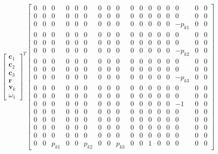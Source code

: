 \documentclass{article}
\begin{document}
\begin{align}
    \begin{bmatrix}
        \mathbf{c}_1 \\
        \mathbf{c}_2 \\
        \mathbf{c}_3 \\
        \mathbf{r} \\
        \mathbf{v}_k \\
        \omega_1
    \end{bmatrix}^T 
    \begin{bmatrix}
        0 & 0 & 0 & 0 & 0 & 0 & 0 & 0 & 0 & 0 & 0 & 0 & 0 & 0 & 0 & 0 & 0 \\
        0 & 0 & 0 & 0 & 0 & 0 & 0 & 0 & 0 & 0 & 0 & 0 & 0 & 0 & 0 & 0 & 0 \\
        0 & 0 & 0 & 0 & 0 & 0 & 0 & 0 & 0 & 0 & 0 & 0 & 0 & 0 & -p_{k1} & 0 & 0 \\
        0 & 0 & 0 & 0 & 0 & 0 & 0 & 0 & 0 & 0 & 0 & 0 & 0 & 0 & 0 & 0 & 0 \\
        0 & 0 & 0 & 0 & 0 & 0 & 0 & 0 & 0 & 0 & 0 & 0 & 0 & 0 & 0 & 0 & 0 \\
        0 & 0 & 0 & 0 & 0 & 0 & 0 & 0 & 0 & 0 & 0 & 0 & 0 & 0 & -p_{k2} & 0 & 0 \\
        0 & 0 & 0 & 0 & 0 & 0 & 0 & 0 & 0 & 0 & 0 & 0 & 0 & 0 & 0 & 0 & 0 \\
        0 & 0 & 0 & 0 & 0 & 0 & 0 & 0 & 0 & 0 & 0 & 0 & 0 & 0 & 0 & 0 & 0 \\
        0 & 0 & 0 & 0 & 0 & 0 & 0 & 0 & 0 & 0 & 0 & 0 & 0 & 0 & -p_{k3} & 0 & 0 \\
        0 & 0 & 0 & 0 & 0 & 0 & 0 & 0 & 0 & 0 & 0 & 0 & 0 & 0 & 0 & 0 & 0 \\
        0 & 0 & 0 & 0 & 0 & 0 & 0 & 0 & 0 & 0 & 0 & 0 & 0 & 0 & 0 & 0 & 0 \\
        0 & 0 & 0 & 0 & 0 & 0 & 0 & 0 & 0 & 0 & 0 & 0 & 0 & 0 & -1 & 0 & 0 \\
        0 & 0 & 0 & 0 & 0 & 0 & 0 & 0 & 0 & 0 & 0 & 0 & 0 & 0 & 0 & 0 & 0 \\
        0 & 0 & 0 & 0 & 0 & 0 & 0 & 0 & 0 & 0 & 0 & 0 & 0 & 0 & 0 & 0 & 0 \\
        0 & 0 & 0 & 0 & 0 & 0 & 0 & 0 & 0 & 0 & 0 & 0 & 0 & 0 & 0 & 0 & 0 \\
        0 & 0 & 0 & 0 & 0 & 0 & 0 & 0 & 0 & 0 & 0 & 0 & 0 & 0 & 0 & 0 & 0 \\
        0 & 0 & p_{k1} & 0 & 0 & p_{k2} & 0 & 0 & p_{k3} & 0 & 0 & 1 & 0 & 0 & 0 & 0 & 0
    \end{bmatrix}

\end{align}
\end{document}
